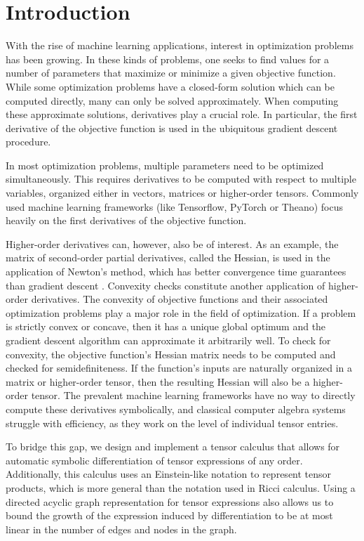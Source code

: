 \documentclass[12pt, a4paper]{report}
\begin{document}
\cleardoublepage
\tableofcontents
\cleardoublepage

\setcounter{page}{5}
\chapter{Introduction}

With the rise of machine learning applications, interest in optimization problems has been growing.
In these kinds of problems, one seeks to find values for a number of parameters that maximize or minimize a given objective function.
While some optimization problems have a closed-form solution which can be computed directly, many can only be solved approximately.
When computing these approximate solutions, derivatives play a crucial role.
In particular, the first derivative of the objective function is used in the ubiquitous gradient descent procedure.

In most optimization problems, multiple parameters need to be optimized simultaneously.
This requires derivatives to be computed with respect to multiple variables, organized either in vectors, matrices or higher-order tensors.
Commonly used machine learning frameworks (like Tensorflow, PyTorch or Theano) focus heavily on the first derivatives of the objective function.

Higher-order derivatives can, however, also be of interest.
As an example, the matrix of second-order partial derivatives, called the Hessian, is used in the application of Newton's method, which has better convergence time guarantees than gradient descent \cite{newtons}.
Convexity checks constitute another application of higher-order derivatives.
The convexity of objective functions and their associated optimization problems play a major role in the field of optimization.
If a problem is strictly convex or concave, then it has a unique global optimum and the gradient descent algorithm can approximate it arbitrarily well.
To check for convexity, the objective function's Hessian matrix needs to be computed and checked for semidefiniteness.
If the function's inputs are naturally organized in a matrix or higher-order tensor, then the resulting Hessian will also be a higher-order tensor.
The prevalent machine learning frameworks have no way to directly compute these derivatives symbolically, and classical computer algebra systems struggle with efficiency, as they work on the level of individual tensor entries.

To bridge this gap, we design and implement a tensor calculus that allows for automatic symbolic differentiation of tensor expressions of any order.
Additionally, this calculus uses an Einstein-like notation to represent tensor products, which is more general than the notation used in Ricci calculus.
Using a directed acyclic graph representation for tensor expressions also allows us to bound the growth of the expression induced by differentiation to be at most linear in the number of edges and nodes in the graph.
\end{document}
